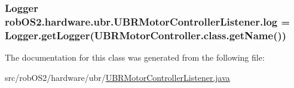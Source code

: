 \label{classrob_o_s2_1_1hardware_1_1ubr_1_1_u_b_r_motor_controller_listener_a45a48cca4f8ba67eb9566eea4aa8db70}
\hypertarget{classrob_o_s2_1_1hardware_1_1ubr_1_1_u_b_r_motor_controller_listener_afd1f1f6b2c2a33a5bb26d871301c3971}{
\subsubsection[{log}]{\setlength{\rightskip}{0pt plus 5cm}Logger {\bf robOS2.hardware.ubr.UBRMotorControllerListener.log} = Logger.getLogger(UBRMotorController.class.getName())}}
\label{classrob_o_s2_1_1hardware_1_1ubr_1_1_u_b_r_motor_controller_listener_afd1f1f6b2c2a33a5bb26d871301c3971}


The documentation for this class was generated from the following file:\begin{DoxyCompactItemize}
\item 
src/robOS2/hardware/ubr/\hyperlink{_u_b_r_motor_controller_listener_8java}{UBRMotorControllerListener.java}\end{DoxyCompactItemize}
